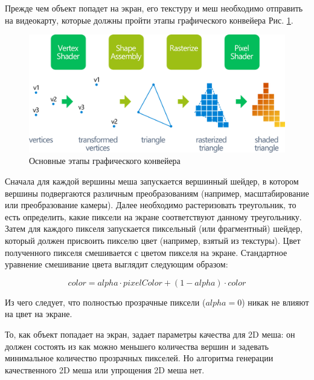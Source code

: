 \documentclass{fefu_thesis/cls/fefu}
\begin{document}
    Прежде чем объект попадет на экран, его текстуру и меш необходимо отправить на видеокарту, которые должны пройти этапы графического конвейера Рис. \ref{GraphicsPipeline}.

    \begin{figure}[H]
        \centering
        \includegraphics[scale=0.8]{images/graphicspipeline.png}
        \caption{Основные этапы графического конвейера}
        \label{GraphicsPipeline}
    \end{figure}

    Сначала для каждой вершины меша запускается вершинный шейдер, в котором вершины подвергаются различным преобразованиям (например, масштабирование или преобразование камеры). Далее необходимо растеризовать треугольник, то есть определить, какие пиксели на экране соответствуют данному треугольнику. Затем для каждого пикселя запускается пиксельный (или фрагментный) шейдер, который должен присвоить пикселю цвет (например, взятый из текстуры). Цвет полученного пикселя смешивается с цветом пикселя на экране. Стандартное уравнение смешивание цвета выглядит следующим образом:

    \[
        color = alpha \cdot pixelColor + (1 - alpha) \cdot color
    \]

    Из чего следует, что полностью прозрачные пиксели ($alpha = 0$) никак не влияют на цвет на экране.

    То, как объект попадает на экран, задает параметры качества для 2D меша: он должен состоять из как можно меньшего количества вершин и задевать минимальное количество прозрачных пикселей. Но алгоритма генерации качественного 2D меша или упрощения 2D меша нет.
\end{document}
